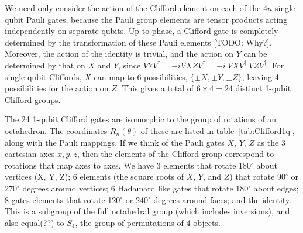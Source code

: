 We need only consider the action of the Clifford element on each of the $4n$ single qubit Pauli gates,  because the Pauli group elements are tensor products acting independently on separate qubits. Up to phase, a Clifford gate is completely determined by the transformation of these Pauli elements [TODO: Why?]. Moreover, the action of the identity is trivial, and the action on $Y$ can be determined by that on $X$ and $Y$, since $VYV^\dagger= -i VXZV^\dagger = -i\ VXV^\dagger\ VZV^\dagger$. For single qubit Cliffords, $X$ can map to 6 possibilities, $\{\pm X, \pm Y, \pm Z\}$,  leaving 4 possibilities for the action on $Z$. This gives a total of $6\times4=24$ distinct 1-qubit Clifford groups.

The 24 1-qubit Clifford gates are isomorphic to the group of rotations of an octahedron.  The coordinates $R_n(\theta)$ of these are listed in table~\ref{tab:Clifford1q}, along with the Pauli mappings.
 If we think of the Pauli gates $X$, $Y$, $Z$ as the 3 cartesian axes $x, y, z$, then the elements of the Clifford group correspond to rotations that map axes to axes. We have 3 elements that rotate 180$^{\circ}$ about vertices (X, Y, Z); 6 elements (the square roots of $X$, $Y$, and $Z$) that rotate 90$^{\circ}$ or 270$^{\circ}$ degrees around vertices; 6 Hadamard like gates that rotate 180$^{\circ}$ about edges;  8 gates elements that  rotate 120$^{\circ}$ or 240$^{\circ}$ degrees around faces; and the identity. This is a subgroup of the full octahedral group (which includes inversions), and also equal(??) to $S_4$, the group of permutations of 4 objects.
  

\begin{center}
 \end{center}


